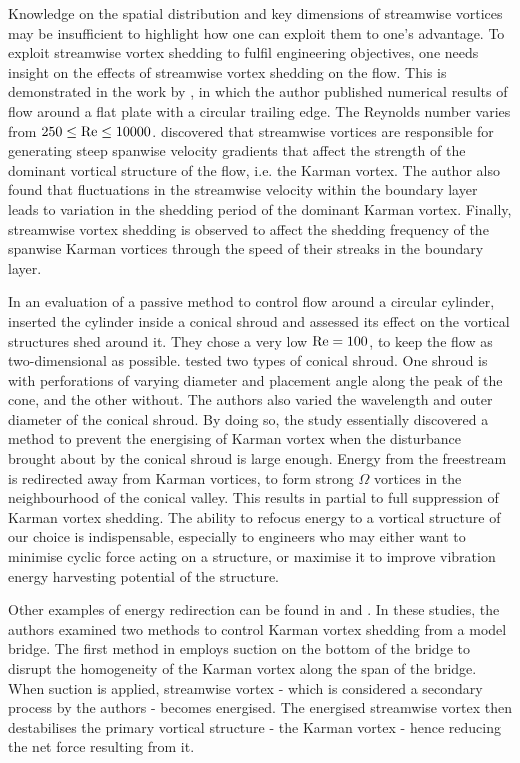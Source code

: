 \documentclass[oneside]{utmthesis}
\begin{document}
Knowledge on the spatial distribution and key dimensions of streamwise vortices may be insufficient to highlight how one can exploit them to one's advantage. To exploit streamwise vortex shedding to fulfil engineering objectives, one needs insight on the effects of streamwise vortex shedding on the flow. This is demonstrated in the work by \citet{Rai2018}, in which the author published numerical results of flow around a flat plate with a circular trailing edge. The Reynolds number varies from $250 \leq \text{Re} \leq 10000$. \citet{Rai2018} discovered that streamwise vortices are responsible for generating steep spanwise velocity gradients that affect the strength of the dominant vortical structure of the flow, i.e. the Karman vortex. The author also found that fluctuations in the streamwise velocity within the boundary layer leads to variation in the shedding period of the dominant Karman vortex. Finally, streamwise vortex shedding is observed to affect the shedding frequency of the spanwise Karman vortices through the speed of their streaks in the boundary layer.

In an evaluation of a passive method to control flow around a circular cylinder, \citet{Lin2018} inserted the cylinder inside a conical shroud and assessed its effect on the vortical structures shed around it. They chose a very low $\text{Re} = 100$, to keep the flow as two-dimensional as possible. \citet{Lin2018} tested two types of conical shroud. One shroud is with perforations of varying diameter and placement angle along the peak of the cone, and the other without. The authors also varied the wavelength and outer diameter of the conical shroud. By doing so, the study essentially discovered a method to prevent the energising of Karman vortex when the disturbance brought about by the conical shroud is large enough. Energy from the freestream is redirected away from Karman vortices, to form strong $\Omega$ vortices in the neighbourhood of the conical valley. This results in partial to full suppression of Karman vortex shedding. The ability to refocus energy to a vortical structure of our choice is indispensable, especially to engineers who may either want to minimise cyclic force acting on a structure, or maximise it to improve vibration energy harvesting potential of the structure.

Other examples of energy redirection can be found in \citet{Zhang2016} and \citet{Zhang2019}. In these studies, the authors examined two methods to control Karman vortex shedding from a model bridge. The first method in \citet{Zhang2016} employs suction on the bottom of the bridge to disrupt the homogeneity of the Karman vortex along the span of the bridge. When suction is applied, streamwise vortex - which is considered a secondary process by the authors - becomes energised. The energised streamwise vortex then destabilises the primary vortical structure - the Karman vortex - hence reducing the net force resulting from it.
\end{document}
